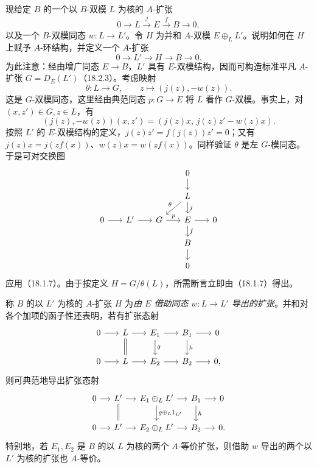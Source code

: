 现给定 $B$ 的一个以 $B$-双模 $L$ 为核的 $A$-扩张
\[
 0\longrightarrow L\xrightarrow{j}E\xrightarrow{f}B\longrightarrow0,
\]
以及一个 $B$-双模同态 $w:L\to L'$。令 $H$ 为并和 $A$-双模 $E\oplus_L L'$。说明如何在 $H$ 上赋予 $A$-环结构，并定义一个 $A$-扩张
\[
 0\longrightarrow L'\longrightarrow H\longrightarrow B\longrightarrow0.
\]
为此注意：经由增广同态 $E\to B$，$L'$ 具有 $E$-双模结构，因而可构造标准平凡 $A$-扩张 $G=D_E(L')$（18.2.3）。考虑映射
\[
 \theta:L\longrightarrow G,\qquad z\longmapsto(j(z),-w(z)).
\]
这是 $G$-双模同态，这里经由典范同态 $p:G\to E$ 将 $L$ 看作 $G$-双模。事实上，对 $(x,z')\in G,z\in L$，有
\[
 (j(z),-w(z))(x,z')=(j(z)x,\,j(z)z'-w(z)x).
\]
按照 $L'$ 的 $E$-双模结构的定义，$j(z)z'=f(j(z))z'=0$；又有 $j(z)x=j(zf(x))$、$w(z)x=w(zf(x))$。同样验证 $\theta$ 是左 $G$-模同态。于是可对交换图
\[
\begin{tikzcd}[column sep=1.7em,row sep=1.3em]
 &&&0\arrow[d]&\\
 &&&L\arrow[d,"j"]\arrow[dl,"\theta"']&\\
0\arrow[r]&L'\arrow[r]&G\arrow[r,"p"]&E\arrow[r]\arrow[d,"f"]&0\\
 &&&B\arrow[d]&\\
 &&&0&
\end{tikzcd}
\]
应用（18.1.7）。由于按定义 $H=G/\theta(L)$，所需断言立即由（18.1.7）得出。

称 $B$ 的以 $L'$ 为核的 $A$-扩张 $H$ 为\emph{由 $E$ 借助同态 $w:L\to L'$ 导出的扩张}。并和对各个加项的函子性还表明，若有扩张态射
\[
\begin{tikzcd}[column sep=1.7em]
0\arrow[r]&L\arrow[r]\arrow[d,equal]&E_1\arrow[r]\arrow[d,"g"]&B_1\arrow[r]\arrow[d,"h"]&0\\
0\arrow[r]&L\arrow[r]&E_2\arrow[r]&B_2\arrow[r]&0,
\end{tikzcd}
\]
则可典范地导出扩张态射
\[
\begin{tikzcd}[column sep=1.2em]
0\arrow[r]&L'\arrow[r]\arrow[d,equal]&E_1\oplus_LL'\arrow[r]\arrow[d,"g\oplus_L1_{L'}"]&B_1\arrow[r]\arrow[d,"h"]&0\\
0\arrow[r]&L'\arrow[r]&E_2\oplus_LL'\arrow[r]&B_2\arrow[r]&0.
\end{tikzcd}
\]
特别地，若 $E_1,E_2$ 是 $B$ 的以 $L$ 为核的两个 $A$-等价扩张，则借助 $w$ 导出的两个以 $L'$ 为核的扩张也 $A$-等价。

